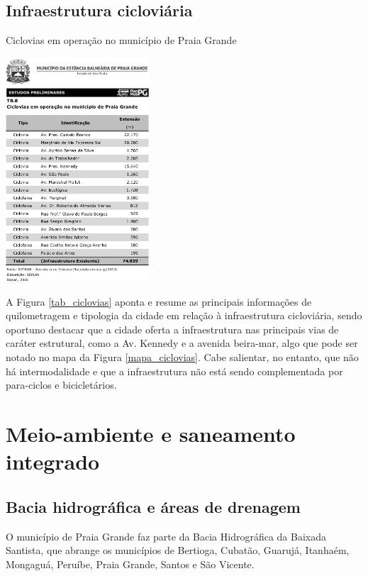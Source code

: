 	\subsection{Infraestrutura cicloviária}

	\begin{table}[!htb]
		\centering
		\caption{Ciclovias em operação no município de Praia Grande}
		\includegraphics[width=0.4\textwidth]{img/TB_8_CICLOVIAS.png}
		\label{tab_ciclovias}
	\end{table}
	
	A Figura \ref{tab_ciclovias} aponta e resume as principais informações de quilometragem e tipologia da cidade em relação à infraestrutura cicloviária, sendo oportuno destacar que a cidade oferta a infraestrutura nas principais vias de caráter estrutural, como a Av. Kennedy e a avenida beira-mar, algo que pode ser notado no mapa da Figura \ref{mapa_ciclovias}. Cabe salientar, no entanto, que não há intermodalidade e que a infraestrutura não está sendo complementada por para-ciclos e bicicletários.
	
		
	\section{Meio-ambiente e saneamento integrado}
	
	\subsection{Bacia hidrográfica e áreas de drenagem}
	
	O município de Praia Grande faz parte da Bacia Hidrográfica da Baixada Santista, que abrange os municípios de Bertioga, Cubatão, Guarujá, Itanhaém, Mongaguá, Peruíbe, Praia Grande, Santos e São Vicente. \cite{ssrh2017a}

